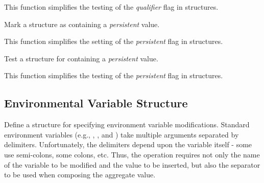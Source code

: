 \begin{arglist}
\end{arglist}

This function simplifies the testing of the \textit{qualifier} flag in  structures.



Mark a  structure as containing a \textit{persistent} value.


\begin{arglist}
\end{arglist}

This function simplifies the setting of the \textit{persistent} flag in  structures.



Test a  structure for containing a \textit{persistent}  value.


\begin{arglist}
\end{arglist}

This function simplifies the testing of the \textit{persistent} flag in  structures.


\subsection{Environmental Variable Structure}

Define a structure for specifying environment variable modifications.
Standard environment variables (e.g., , , and )
take multiple arguments separated by delimiters. Unfortunately, the delimiters
depend upon the variable itself - some use semi-colons, some colons, etc. Thus,
the operation requires not only the name of the variable to be modified and
the value to be inserted, but also the separator to be used when composing
the aggregate value.

